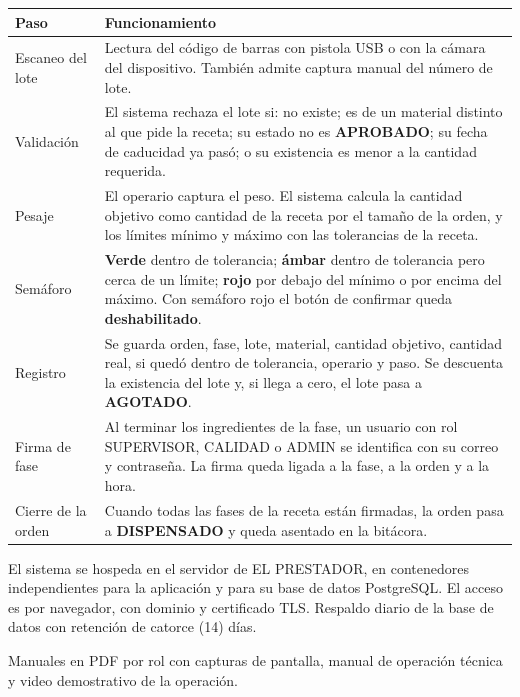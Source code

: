 \documentclass[11pt,letterpaper]{article}
\begin{document}
\vspace{6pt}
\noindent\footnotesize
\begin{tabularx}{\linewidth}{@{}L{3.4cm} X@{}}
\toprule
\textbf{Paso} & \textbf{Funcionamiento} \\
\midrule
Escaneo del lote & Lectura del código de barras con pistola USB o con la cámara del dispositivo. También admite captura manual del número de lote. \\
Validación & El sistema rechaza el lote si: no existe; es de un material distinto al que pide la receta; su estado no es \textbf{APROBADO}; su fecha de caducidad ya pasó; o su existencia es menor a la cantidad requerida. \\
Pesaje & El operario captura el peso. El sistema calcula la cantidad objetivo como cantidad de la receta por el tamaño de la orden, y los límites mínimo y máximo con las tolerancias de la receta. \\
Semáforo & \textbf{Verde} dentro de tolerancia; \textbf{ámbar} dentro de tolerancia pero cerca de un límite; \textbf{rojo} por debajo del mínimo o por encima del máximo. Con semáforo rojo el botón de confirmar queda \textbf{deshabilitado}. \\
Registro & Se guarda orden, fase, lote, material, cantidad objetivo, cantidad real, si quedó dentro de tolerancia, operario y paso. Se descuenta la existencia del lote y, si llega a cero, el lote pasa a \textbf{AGOTADO}. \\
Firma de fase & Al terminar los ingredientes de la fase, un usuario con rol SUPERVISOR, CALIDAD o ADMIN se identifica con su correo y contraseña. La firma queda ligada a la fase, a la orden y a la hora. \\
Cierre de la orden & Cuando todas las fases de la receta están firmadas, la orden pasa a \textbf{DISPENSADO} y queda asentado en la bitácora. \\
\bottomrule
\end{tabularx}
\normalsize

\vspace{6pt}
\noindent El sistema se hospeda en el servidor de EL PRESTADOR, en contenedores independientes para la aplicación y para su base de datos PostgreSQL. El acceso es por navegador, con dominio y certificado TLS. Respaldo diario de la base de datos con retención de catorce (14) días.

\vspace{6pt}
\noindent Manuales en PDF por rol con capturas de pantalla, manual de operación técnica y video demostrativo de la operación.
\end{document}
